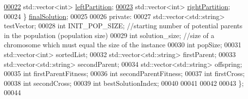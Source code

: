 \begin{DoxyCode}
\hypertarget{_g_a_8h_source_l00022}{}\hyperlink{struct_g_a_1_1final_solution_struct_aedc052fa2f16ac65ef65b23692177ab9}{00022}         std::vector<int> \hyperlink{struct_g_a_1_1final_solution_struct_aedc052fa2f16ac65ef65b23692177ab9}{leftPartition};
\hypertarget{_g_a_8h_source_l00023}{}\hyperlink{struct_g_a_1_1final_solution_struct_a61ec4bab473d91916ca5fee656fb9a15}{00023}         std::vector<int> \hyperlink{struct_g_a_1_1final_solution_struct_a61ec4bab473d91916ca5fee656fb9a15}{rightPartition};
00024     \} \hyperlink{class_g_a_a301e86430cdc9d3af98d85267fb0f963}{finalSolution};
00025 
00026 \textcolor{keyword}{private}:
00027     std::vector<std::string> testVector;
00028     \textcolor{keywordtype}{int} INIT\_POP\_SIZE; \textcolor{comment}{//starting number of potential parents in the population (population size)}
00029     \textcolor{keywordtype}{int} solution\_size; \textcolor{comment}{//size of a chromosome which must equal the size of the instance}
00030     \textcolor{keywordtype}{int} popSize;
00031     std::vector<int> sortedList;
00032     std::vector<std::string> firstParent;
00033     std::vector<std::string> secondParent;
00034     std::vector<std::string> offspring;
00035     \textcolor{keywordtype}{int} firstParentFitness;
00036     \textcolor{keywordtype}{int} secondParentFitness;
00037     \textcolor{keywordtype}{int} firstCross; 
00038     \textcolor{keywordtype}{int} secondCross;
00039     \textcolor{keywordtype}{int} bestSolutionIndex;
00040     
00041 
00042 
00043 \};
00044 
\end{DoxyCode}
